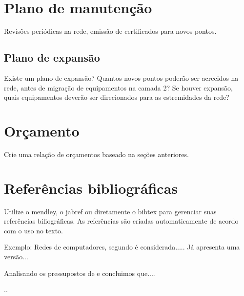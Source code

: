 \documentclass[	DIV=calc,%
							paper=a4,%
							fontsize=12pt,%
							onecolumn]{scrartcl}	 					%
\begin{document}
\section{Plano de manutenção}

Revisões periódicas na rede, emissão de certificados para novos pontos.

\subsection{Plano de expansão}
Existe um plano de expansão? Quantos novos pontos poderão ser acrecidos na rede, antes de migração de equipamentos na camada 2? Se houver expansão, quais equipamentos deverão ser direcionados para as estremidades da rede? 


\section{Orçamento}
Crie uma relação de orçamentos baseado na seções anteriores.

\section{Referências bibliográficas}
Utilize o mendley, o jabref ou diretamente o bibtex para gerenciar suas referências biliográficas. As referências são criadas automaticamente de acordo com o uso no texto.

Exemplo: Redes de computadores, segundo \cite{t2013} é considerada..... Já \cite{kurose2010} apresenta uma versão...

Analisando os pressupostos de \cite{ref3} e \cite{ref4} concluimos que....


\renewcommand\refname{} %

  

..
\end{document}
